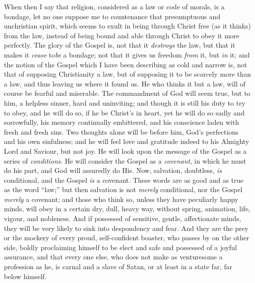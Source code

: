 When then I say that religion, considered as a law or code of
morals, is a bondage, let no one suppose me to countenance that
presumptuous and unchristian spirit, which seems to exult in being
through Christ free (as it thinks) from the law, instead of being
bound and able through Christ to obey it more perfectly. The glory of
the Gospel is, not that it \emph{destroys} the law, but that it makes
it \emph{cease} to\emph{be} a bondage; not that it gives us freedom \emph{from}
it, but \emph{in} it; and the notion of the Gospel which I have been
describing as cold and narrow is, not that of supposing Christianity a
law, but of supposing it to be scarcely more than a law, and thus
leaving us where it found us. He who thinks it but a law, will of
course be fearful and miserable. The commandment of God will seem
true, but to him, a helpless sinner, hard and uninviting; and though
it is still his duty to try to obey, and he will do so, if he be
Christ's in heart, yet he will do so sadly and sorrowfully, his memory
continually embittered, and his conscience laden with fresh and fresh
sins. Two thoughts alone will be before him, God's perfections and his
own sinfulness; and he will feel love and gratitude indeed to his
Almighty Lord and Saviour, but not joy. He will look upon the message
of the Gospel as a series of \emph{conditions}. He will consider the
Gospel as a \emph{covenant}, in which he must do his part, and God
will assuredly do His. Now, salvation, doubtless, \emph{is}
conditional, and the Gospel \emph{is} a covenant. These words are as
good and as true as the word ``law;'' but then salvation is
not \emph{merely} conditional, nor the Gospel \emph{merely} a
covenant; and those who think so, unless they have peculiarly happy
minds, will obey in a certain dry, dull, heavy way, without spring,
animation, life, vigour, and nobleness. And if possessed of sensitive,
gentle, affectionate minds, they will be very likely to sink into
despondency and fear. And they are the prey or the mockery of every
proud, self-confident boaster, who passes by on the other side, boldly
proclaiming himself to be elect and safe and possessed of a joyful
assurance, and that every one else, who does not make as venturesome a
profession as he, is carnal and a slave of Satan, or at least in a
state far, far below himself.

